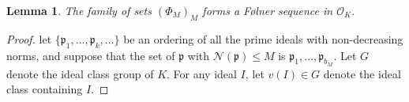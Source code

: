\documentclass[11pt]{amsart}
\newtheorem{lemma}{Lemma}[section]
\theoremstyle{definition}
\newcommand{\NN}{{\mathcal N}}
\newcommand{\Z}{{\mathbb Z}}
\newcommand{\mf}{\mathfrak}
\begin{document}
\begin{lemma}
    The family of sets $(\Phi_{M})_{M}$ forms a F\o lner sequence in $\mathcal{O}_K$.
\end{lemma}
\begin{proof}
    let $\{\mathfrak{p}_{1},\dots,\mf p_k, \dots\}$ be an ordering of all the prime ideals with non-decreasing norms, and suppose that the set of $\mathfrak{p}$ with $\NN(\mathfrak{p})\leq M$ is $\mathfrak{p}_{1},\dots,\mathfrak{p}_{b_{M}}$. 
Let $G$ denote the ideal class group of $K$. For any ideal $I$, let $v(I)\in G$ denote the ideal class containing $I$.  




    


\end{proof}
\end{document}
